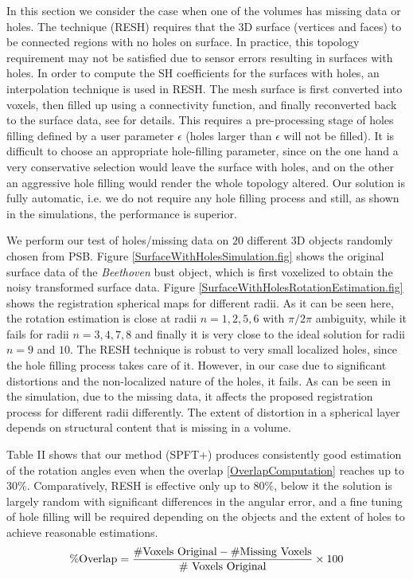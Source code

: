\documentclass{UCF_ETD}
\begin{document}
In this section we consider the case when one of the volumes has missing data or holes. The technique \cite{Salah2013} (RESH) requires that the $3$D surface (vertices and faces)  to be connected regions with no holes on surface. In practice, this topology requirement may not be satisfied due to sensor errors resulting in surfaces with holes. In order to compute the SH coefficients for the surfaces with holes, an interpolation technique is used in RESH. The mesh surface is first converted into voxels, then filled up using a connectivity function, and finally reconverted back to the surface data, see \cite{Salah2013} for details. This requires a pre-processing stage of holes filling defined by a user parameter $\epsilon$ (holes larger than $\epsilon$ will not be filled). It is difficult to choose an appropriate hole-filling parameter, since on the one hand a very conservative selection would leave the surface with holes, and on the other an aggressive hole filling would render the whole topology altered. Our solution is fully automatic, i.e. we do not require any hole filling process and still, as shown in the simulations, the performance is superior.

We perform our test of holes/missing data on $20$ different 3D objects randomly chosen from PSB.  Figure \ref{SurfaceWithHolesSimulation.fig} shows the original surface data of the \emph{Beethoven} bust object, which is first voxelized to obtain the noisy transformed surface data. Figure \ref{SurfaceWithHolesRotationEstimation.fig} shows the registration spherical maps for different radii. As it can be seen here, the rotation estimation is close at radii $n = 1,2,5,6$ with $\pi/ 2\pi$ ambiguity, while it fails for radii $n= 3,4,7,8$ and finally it is very close to the ideal solution for radii  $n=9$ and $10$. The RESH technique is robust to very small localized holes, since the hole filling process takes care of it. However, in our case due to significant distortions and the non-localized nature of the holes, it fails. As can be seen in the simulation, due to the missing data, it affects the proposed registration process for different radii differently. The extent of distortion in a spherical layer depends on structural content that is missing in a volume. 

Table II shows that our method (SPFT+) produces consistently good estimation of the rotation angles even when the overlap \eqref{OverlapComputation} reaches up to $30 \%$. Comparatively, RESH is effective only up to $80\%$, below it the solution is largely random with significant differences in the angular error, and a fine tuning of hole filling will be required depending on the objects and the extent of holes to achieve reasonable estimations. 
\begin{eqnarray}\label{OverlapComputation}
\rm{ \% Overlap = \frac{\# {Voxels~Original}  - \# { Missing~ Voxels}}{\#~ {Voxels~Original}} \times 100  }
\end{eqnarray}
\end{document}
